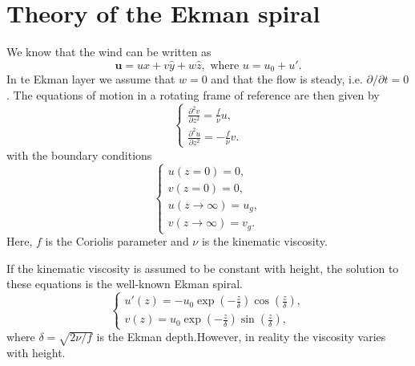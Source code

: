 \section{Theory of the Ekman spiral}
We know that the wind can be written as 
\begin{equation}
\mathbf{u} = u \hat{x} + v \hat{y} + w \hat{z}, \text{ where } {u}={u}_0+u'. 
\end{equation} 
In te Ekman layer we assume that $w=0$ and that the flow is steady, i.e. $\partial/\partial t = 0$. The equations of motion in a rotating frame of reference are then given by
\begin{equation}
    \begin{cases}
        \frac{\partial^2 v}{\partial z^2} = \frac{f}{\nu} u, \\
\frac{\partial^2 u}{\partial z^2} = -\frac{f}{\nu} v.
    \end{cases}
\end{equation}
with the boundary conditions
\begin{equation}
    \begin{cases}
        u(z=0) = 0, \\
v(z=0) = 0, \\
        u(z \to \infty) = u_g, \\
v(z \to \infty) = v_g.
    \end{cases}
\end{equation}
Here, $f$ is the Coriolis parameter and $\nu$ is the kinematic viscosity. 

If the kinematic viscosity is assumed to be constant with height, the solution to these equations is the well-known Ekman spiral. 
\begin{equation}
    \begin{cases}
        u'(z) = -u_0  \exp\left({-\frac{z}{\delta}}\right) \cos\left(\frac{z}{\delta}\right), \\
v(z) = u_0  \exp\left({-\frac{z}{\delta}}\right) \sin\left(\frac{z}{\delta}\right),
    \end{cases}
\end{equation}
where $\delta = \sqrt{2\nu/f}$ is the Ekman depth.However, in reality the viscosity varies with height. 



